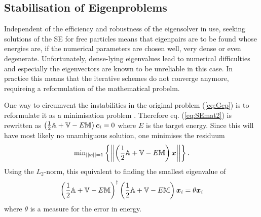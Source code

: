 \subsection{Stabilisation of Eigenproblems}
\label{ch:regular}
Independent of the efficiency and robustness of the eigensolver in use, seeking solutions of the SE for free particles means that eigenpairs are to be found whose energies are, if the numerical parameters are chosen well, very dense or even degenerate.
Unfortunately, dense-lying eigenvalues lead to numerical difficulties and especially the eigenvectors are known to be unreliable in this case.
In practice this means that the iterative schemes do not converge anymore, requireing a reformulation of the mathematical probelm.

One way to circumvent the instabilities in the original problem (\ref{eq:Gep}) is to reformulate it as a minimisation problem \cite{H2pDeCleva}.
Therefore eq. (\ref{eq:SEmat2}) is rewritten as $\left(\frac 12 \mathbb{A}+\mathbb{V} - E \mathbb{M}\right)\bm{c}_i = 0$ where $E$ is the target energy.
Since this will have most likely no unambiguous solution, one minimises the residuum
\begin{equation}
\text{min}_{||\bm{x}||=1}\left\{\left|\left|\left(\frac 12 \mathbb{A}+\mathbb{V}-E\mathbb{M}\right)\bm{x} \right|\right| \right\}.
\end{equation}
Using the $L_2$-norm, this equivalent to finding the smallest eigenvalue of
\begin{equation} \label{eq:SEmin}
\left(\frac 12 \mathbb{A}+\mathbb{V}-E\mathbb{M}\right)^\dagger
\left(\frac 12 \mathbb{A}+\mathbb{V}-E\mathbb{M}\right) \bm{x}_i = \theta \bm{x}_i
\end{equation}
where $\theta$ is a measure for the error in energy.
%

